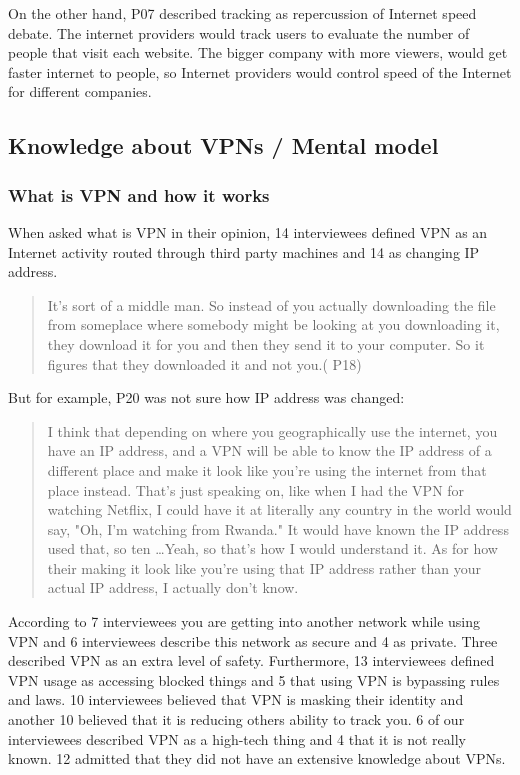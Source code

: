 On the other hand, P07 described tracking as repercussion of Internet speed debate. The internet providers would track users to evaluate the number of people that visit each website. The bigger company with more viewers, would get faster internet to people, so Internet providers would control speed of the Internet for different companies. 


\subsection{Knowledge about VPNs / Mental model}

\subsubsection{What is VPN and how it works}

When asked what is VPN in their opinion, 14 interviewees defined VPN as an Internet activity routed through third party machines and 14 as changing IP address. 
\begin{quote}It's sort of a middle man. So instead of you actually downloading the file from someplace where somebody might be looking at you downloading it, they download it for you and then they send it to your computer. So it figures that they downloaded it and not you.( P18)\end{quote}


But for example, P20 was not sure how IP address was changed:
\begin{quote}I think that depending on where you geographically use the internet, you have an IP address, and a VPN will be able to know the IP address of a different place and make it look like you're using the internet from that place instead. That's just speaking on, like when I had the VPN for watching Netflix, I could have it at literally any country in the world would say, "Oh, I'm watching from Rwanda." It would have known the IP address used that, so ten \dots Yeah, so that's how I would understand it.
As for how their making it look like you're using that IP address rather than your actual IP address, I actually don't know.\end{quote}


According to 7 interviewees you are getting into another network while using VPN and 6 interviewees describe this network as secure and 4 as private. 
Three described VPN as an extra level of safety. Furthermore, 13 interviewees defined VPN usage as accessing blocked things and 5 that using VPN is bypassing rules and laws. 10 interviewees believed that VPN is masking their identity and another 10 believed that it is reducing others ability to track you.  6 of our interviewees described VPN as a high-tech thing and 4 that it is not really known. 12 admitted that they did not have an extensive knowledge about VPNs.

